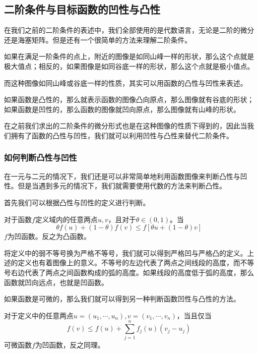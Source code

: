 \documentclass[UTF8,12pt]{ctexart}
\numberwithin{equation}{section} %
\numberwithin{figure}{section}
\numberwithin{table}{section}
\begin{document}
	\subsection{二阶条件与目标函数的凹性与凸性}
	
	在我们之前的二阶条件的表述中，我们全部使用的是代数语言，无论是二阶的微分还是海塞矩阵。但是还有一个很简单的方法来理解二阶条件。
	
	如果在满足一阶条件的点上，附近的图像是如同山峰一样的形状，那么这个点就是极大值点；相反的，如果图像是如同谷底一样的形状，那么这个点就是极小值点。
	
	而这种图像如同山峰或谷底一样的性质，其实可以用函数的凸性与凹性来表述。
	
	如果函数是凸性的，那么就表示函数的图像凸向原点，那么图像就有谷底的形状；如果函数是凹性的，那么函数的图像就凹向原点，那么图像就有山峰的形状。
	
	在之前我们求出的二阶条件的微分形式也是在这种图像的性质下得到的，因此当我们拥有了函数的凸性与凹性，我们就可以利用凹性与凸性来替代二阶条件。
	
	\subsubsection{如何判断凸性与凹性}
	
	在一元与二元的情况下，我们还是可以非常简单地利用函数图像来判断凸性与凹性。但是当遇到多元的情况下，我们就需要使用代数的方法来判断凸性。
	
	首先我们可以根据凸性与凹性的定义进行判断。
	
	对于函数$f$定义域内的任意两点$u,v$，且对于$\theta \in (0,1)$。当
	\begin{equation}
		\theta f(u) + (1 - \theta) f(v) \leqslant 
		f[\theta u + (1 - \theta) v]
	\end{equation}
	$f$为凹函数。反之为凸函数。
	
	将定义中的弱不等号换为严格不等号，我们就可以得到严格凹与严格凸的定义。上述的定义也有着图像上的意义。不等号的左边代表了两点之间线段的高度，而不等号右边代表了两点之间函数构成的弧的高度。如果线段的高度低于弧的高度，那么函数就凹向远点，也就是凹函数。
	
	如果函数是可微的，那么我们就可以得到另一种判断函数凹性与凸性的方法。
	
	对于定义中的任意两点$u = (u_1,\cdots,u_n),v = (v_1,\cdots,v_n)$，当且仅当
	\begin{equation}
		f(v) \leqslant f(u) + \sum_{j = 1}^{n}f_j(u)(v_j - u_j)	\end{equation}
	可微函数$f$为凹函数，反之同理。
	
\end{document}
